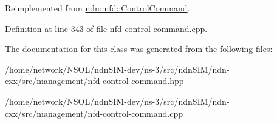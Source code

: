 Reimplemented from \hyperlink{classndn_1_1nfd_1_1ControlCommand_a479414f06f65e7ad819c94e365fa0981}{ndn\+::nfd\+::\+Control\+Command}.



Definition at line 343 of file nfd-\/control-\/command.\+cpp.



The documentation for this class was generated from the following files\+:\begin{DoxyCompactItemize}
\item 
/home/network/\+N\+S\+O\+L/ndn\+S\+I\+M-\/dev/ns-\/3/src/ndn\+S\+I\+M/ndn-\/cxx/src/management/nfd-\/control-\/command.\+hpp\item 
/home/network/\+N\+S\+O\+L/ndn\+S\+I\+M-\/dev/ns-\/3/src/ndn\+S\+I\+M/ndn-\/cxx/src/management/nfd-\/control-\/command.\+cpp\end{DoxyCompactItemize}
